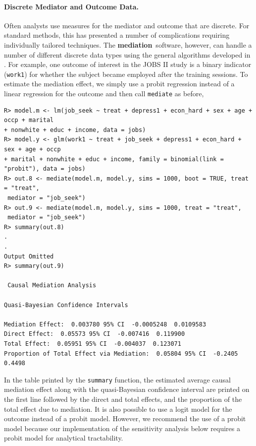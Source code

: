 \documentclass[11pt,letterpaper]{article}
\theoremstyle{plain}
\newcommand\bmediation{{\bf mediation}}
\begin{document}
\paragraph{Discrete Mediator and Outcome Data.}

Often analysts use measures for the mediator and outcome that are
discrete.  For standard methods, this has presented a number of
complications requiring individually tailored techniques.  The
\bmediation\ software, however, can handle a number of different
discrete data types using the general algorithms developed in
\citet{imai:keel:ting:10}.  For example, one outcome of interest in
the JOBS II study is a binary indicator (\texttt{work1}) for whether
the subject became employed after the training sessions. To estimate
the mediation effect, we simply use a probit regression instead of a
linear regression for the outcome and then call \texttt{mediate} as
before,
\begin{verbatim}
R> model.m <- lm(job_seek ~ treat + depress1 + econ_hard + sex + age + occp + marital
+ nonwhite + educ + income, data = jobs)
R> model.y <- glm(work1 ~ treat + job_seek + depress1 + econ_hard + sex + age + occp
+ marital + nonwhite + educ + income, family = binomial(link = "probit"), data = jobs)
R> out.8 <- mediate(model.m, model.y, sims = 1000, boot = TRUE, treat = "treat",
 mediator = "job_seek")
R> out.9 <- mediate(model.m, model.y, sims = 1000, treat = "treat",
 mediator = "job_seek")
R> summary(out.8)
.
.
Output Omitted
R> summary(out.9)

 Causal Mediation Analysis

Quasi-Bayesian Confidence Intervals

Mediation Effect:  0.003780 95% CI  -0.0005248  0.0109583
Direct Effect:  0.05573 95% CI  -0.007416  0.119900
Total Effect:  0.05951 95% CI  -0.004037  0.123071
Proportion of Total Effect via Mediation:  0.05804 95% CI  -0.2405  0.4498
\end{verbatim}

In the table printed by the \texttt{summary} function, the estimated
average causal mediation effect along with the quasi-Bayesian
confidence interval are printed on the first line followed by the
direct and total effects, and the proportion of the total effect due
to mediation.  It is also possible to use a logit model for the
outcome instead of a probit model.  However, we recommend the use of a
probit model because our implementation of the sensitivity analysis
below requires a probit model for analytical tractability.
\end{document}
